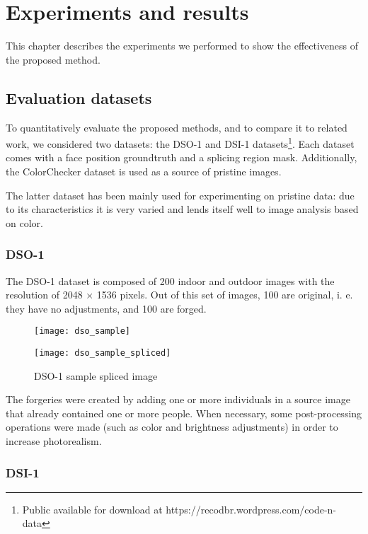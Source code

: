 \chapter{Experiments and results}

This chapter describes the experiments we performed to show the effectiveness of the proposed method. 

\section{Evaluation datasets}
To quantitatively evaluate the proposed methods, and to compare it to related work,
we considered two datasets: the DSO-1 and DSI-1 datasets\footnote{Public available for download at https://recodbr.wordpress.com/code-n-data}. Each dataset comes with a face position groundtruth and a splicing region mask. Additionally, the ColorChecker dataset \cite{gehler2008bayesian} is used as a source of pristine images.

The latter dataset has been mainly used for experimenting on pristine data: due to its characteristics it is very varied and lends itself well to image analysis based on color.

\subsection{DSO-1}

The DSO-1 dataset is composed of 200 indoor and outdoor images with the resolution of 2048 × 1536 pixels. Out of this set of images, 100 are original, i. e. they have no adjustments, and 100 are forged. 

\begin{figure}[!htb]
  \texttt{[image: dso\_sample]}
  \caption{DSO-1 sample original image}\label{fig:dsooriginalimage}
\endminipage\hfill
{}
  \texttt{[image: dso\_sample\_spliced]}
  \caption{DSO-1 sample spliced image}\label{fig:dsosplicedimage}
\endminipage
\end{figure}

The forgeries were created by adding one or more individuals in a source image that already contained one or more people. When necessary, some post-processing operations were made (such as color and brightness adjustments) in order to increase photorealism.

\subsection{DSI-1}

